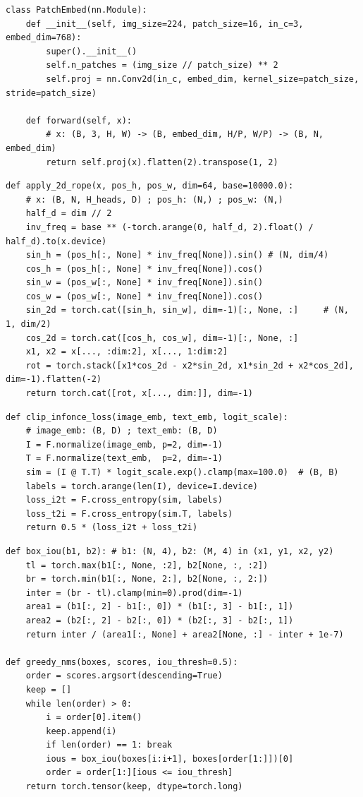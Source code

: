 \begin{lstlisting}
class PatchEmbed(nn.Module):
    def __init__(self, img_size=224, patch_size=16, in_c=3, embed_dim=768):
        super().__init__()
        self.n_patches = (img_size // patch_size) ** 2
        self.proj = nn.Conv2d(in_c, embed_dim, kernel_size=patch_size, stride=patch_size)

    def forward(self, x):
        # x: (B, 3, H, W) -> (B, embed_dim, H/P, W/P) -> (B, N, embed_dim)
        return self.proj(x).flatten(2).transpose(1, 2)
\end{lstlisting}

\begin{lstlisting}
def apply_2d_rope(x, pos_h, pos_w, dim=64, base=10000.0):
    # x: (B, N, H_heads, D) ; pos_h: (N,) ; pos_w: (N,)
    half_d = dim // 2
    inv_freq = base ** (-torch.arange(0, half_d, 2).float() / half_d).to(x.device)
    sin_h = (pos_h[:, None] * inv_freq[None]).sin() # (N, dim/4)
    cos_h = (pos_h[:, None] * inv_freq[None]).cos()
    sin_w = (pos_w[:, None] * inv_freq[None]).sin()
    cos_w = (pos_w[:, None] * inv_freq[None]).cos()
    sin_2d = torch.cat([sin_h, sin_w], dim=-1)[:, None, :]     # (N, 1, dim/2)
    cos_2d = torch.cat([cos_h, cos_w], dim=-1)[:, None, :]
    x1, x2 = x[..., :dim:2], x[..., 1:dim:2]
    rot = torch.stack([x1*cos_2d - x2*sin_2d, x1*sin_2d + x2*cos_2d], dim=-1).flatten(-2)
    return torch.cat([rot, x[..., dim:]], dim=-1)
\end{lstlisting}

\begin{lstlisting}
def clip_infonce_loss(image_emb, text_emb, logit_scale):
    # image_emb: (B, D) ; text_emb: (B, D)
    I = F.normalize(image_emb, p=2, dim=-1)
    T = F.normalize(text_emb,  p=2, dim=-1)
    sim = (I @ T.T) * logit_scale.exp().clamp(max=100.0)  # (B, B)
    labels = torch.arange(len(I), device=I.device)
    loss_i2t = F.cross_entropy(sim, labels)
    loss_t2i = F.cross_entropy(sim.T, labels)
    return 0.5 * (loss_i2t + loss_t2i)
\end{lstlisting}

\begin{lstlisting}
def box_iou(b1, b2): # b1: (N, 4), b2: (M, 4) in (x1, y1, x2, y2)
    tl = torch.max(b1[:, None, :2], b2[None, :, :2])
    br = torch.min(b1[:, None, 2:], b2[None, :, 2:])
    inter = (br - tl).clamp(min=0).prod(dim=-1)
    area1 = (b1[:, 2] - b1[:, 0]) * (b1[:, 3] - b1[:, 1])
    area2 = (b2[:, 2] - b2[:, 0]) * (b2[:, 3] - b2[:, 1])
    return inter / (area1[:, None] + area2[None, :] - inter + 1e-7)

def greedy_nms(boxes, scores, iou_thresh=0.5):
    order = scores.argsort(descending=True)
    keep = []
    while len(order) > 0:
        i = order[0].item()
        keep.append(i)
        if len(order) == 1: break
        ious = box_iou(boxes[i:i+1], boxes[order[1:]])[0]
        order = order[1:][ious <= iou_thresh]
    return torch.tensor(keep, dtype=torch.long)
\end{lstlisting}

